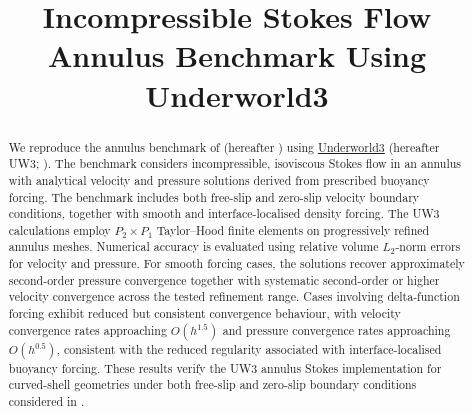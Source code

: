 \documentclass[gmd, manuscript]{copernicus}
\begin{document}
\title{Incompressible Stokes Flow Annulus Benchmark Using Underworld3}




\received{}
\pubdiscuss{}
\revised{}
\accepted{}
\published{}


\maketitle

\begin{abstract}
We reproduce the annulus benchmark of \citet{kramer2021}
(hereafter ) using
\href{https://github.com/underworldcode/underworld3}{Underworld3}
(hereafter UW3; \citealp{Moresi2025}). The benchmark considers incompressible,
isoviscous Stokes flow in an annulus with
analytical velocity and pressure solutions derived from prescribed
buoyancy forcing. The benchmark includes both free-slip and zero-slip
velocity boundary conditions, together with smooth and
interface-localised density forcing.
The UW3 calculations employ \(P_2\times P_1\) Taylor--Hood finite
elements on progressively refined annulus meshes. Numerical accuracy is
evaluated using relative volume \(L_2\)-norm errors for velocity and
pressure. For smooth forcing cases, the solutions recover approximately
second-order pressure convergence together with systematic second-order
or higher velocity convergence across the tested refinement range.
Cases involving delta-function forcing exhibit reduced but consistent
convergence behaviour, with velocity convergence rates approaching
\(O(h^{1.5})\) and pressure convergence rates approaching
\(O(h^{0.5})\), consistent with the reduced regularity associated with
interface-localised buoyancy forcing.
These results verify the UW3 annulus Stokes implementation for
curved-shell geometries under both free-slip and zero-slip boundary
conditions considered in .
\end{abstract}

\introduction
\end{document}

